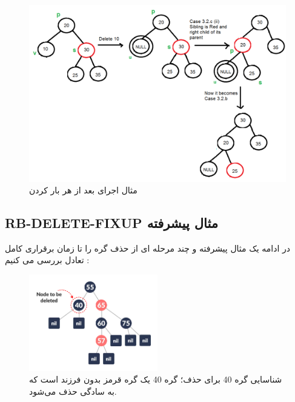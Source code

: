 \documentclass[a4paper,12pt]{article}
\begin{document}
			
	\vspace{20pt}
	
	\begin{figure}[H]
		\centering
		\includegraphics[width=1.0\textwidth]{img/delete-fixup.png} %
		\caption{مثال اجرای    بعد از هر بار    کردن}
	\end{figure}
	
	
			\subsection{RB-DELETE-FIXUP مثال پیشرفته }
			در ادامه یک مثال پیشرفته و چند مرحله ای از حذف گره را تا زمان برقراری کامل تعادل بررسی می کنیم :
	\begin{figure}[H]
		\centering
		\includegraphics[width=0.5\textwidth]{img/advancedDelFix/delete-1-red-black.png} %
		\caption{شناسایی گره 40 برای حذف؛ گره 40 یک گره قرمز بدون فرزند است که به سادگی حذف می‌شود.}
	\end{figure}
	
\end{document}
